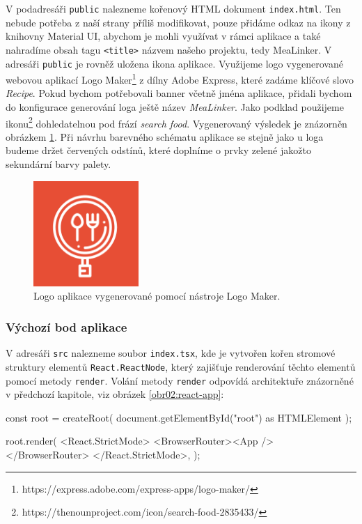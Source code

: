 V podadresáři \texttt{public} nalezneme kořenový HTML dokument \texttt{index.html}. Ten nebude potřeba z naší strany příliš modifikovat, pouze přidáme odkaz na ikony z knihovny Material UI, abychom je mohli využívat v rámci aplikace a také nahradíme obsah tagu \texttt{<title>} názvem našeho projektu, tedy MeaLinker. V adresáři \texttt{public} je rovněž uložena ikona aplikace. Využijeme logo vygenerované webovou aplikací Logo Maker\footnote{https://express.adobe.com/express-apps/logo-maker/} z dílny Adobe Express, které zadáme klíčové slovo \emph{Recipe}. Pokud bychom potřebovali banner včetně jména aplikace, přidali bychom do konfigurace generování loga ještě název \emph{MeaLinker}. Jako podklad použijeme ikonu\footnote{https://thenounproject.com/icon/search-food-2835433/} dohledatelnou pod frází \emph{search food}. Vygenerovaný výsledek je znázorněn obrázkem \ref{obr03:mealinker-logo}. Při návrhu barevného schématu aplikace se stejně jako u loga budeme držet červených odstínů, které doplníme o prvky zelené jakožto sekundární barvy palety.

\begin{figure}[h!]\centering
\includegraphics[width=40mm]{../img/mealinker-logo}
\caption{Logo aplikace vygenerované pomocí nástroje Logo Maker.}
\label{obr03:mealinker-logo}
\end{figure}

\subsubsection{Výchozí bod aplikace}

V adresáři \texttt{src} nalezneme soubor \texttt{index.tsx}, kde je vytvořen kořen stromové struktury elementů \texttt{React.ReactNode}, který zajišťuje renderování těchto elementů pomocí metody \texttt{render}. Volání metody \texttt{render} odpovídá architektuře znázorněné v předchozí kapitole, viz obrázek \ref{obr02:react-app}:
\begin{code}
const root = createRoot(
    document.getElementById("root") as HTMLElement
);

root.render(
  <React.StrictMode>
    <BrowserRouter><App /></BrowserRouter>
  </React.StrictMode>,
);
\end{code}

